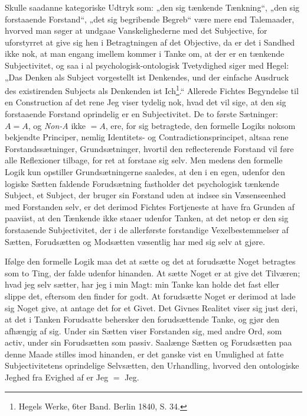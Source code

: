 \documentclass[11pt]{book}
\newcommand{\opage}[1]{\marginnote{\footnotesize\textit{[#1]}}}
\begin{document}
Skulle saadanne kategoriske Udtryk som: „den sig tænkende Tænkning“, „den
sig forstaaende Forstand“, „det sig begribende Begreb“ være mere end
Talemaader, hvorved man søger at undgaae Vanskelighederne med det
Subjective, for uforstyrret at give sig hen i Betragtningen af det
Objective, da er det i Sandhed ikke nok, at man engang imellem kommer i
Tanke om, at der er en tænkende Subjectivitet, og
\opage{64} \setcounter{footnote}{0}%
saa i al psychologisk-ontologisk Tvetydighed siger med Hegel: „Das Denken
als Subject vorgestellt ist Denkendes, und der einfache Ausdruck des
existirenden Subjects als Denkenden ist Ich\footnote{Hegels Werke, 6ter
Band. Berlin 1840, S. 34.}.“ Allerede Fichtes Begyndelse til en
Construction af det rene Jeg viser tydelig nok, hvad det vil sige, at den
sig forstaaende Forstand oprindelig er en Subjectivitet. De to første
Sætninger: $A = A$, og \textit{Non-A} ikke $= A$, ere, for sig betragtede,
den formelle Logiks noksom bekjendte Principer, nemlig Identitets- og
Contradictionsprincipet, altsaa rene Forstandssætninger, Grundsætninger,
hvortil den reflecterende Forstand vil føre alle Reflexioner tilbage, for
ret at forstaae sig selv. Men medens den formelle Logik kun opstiller
Grundsætningerne saaledes, at den i en egen, udenfor den logiske Sætten
faldende Forudsætning fastholder det psychologisk tænkende Subject, et
Subject, der bruger sin Forstand uden at indsee sin Væsenseenhed med
Forstanden selv, er det derimod Fichtes Fortjeneste at have fra Grunden af
paaviist, at den Tænkende ikke staaer udenfor Tanken, at det netop er den
sig forstaaende Subjectivitet, der i de allerførste forstandige
Vexelbestemmelser af Sætten, Forudsætten og Modsætten væsentlig har med sig
selv at gjøre.

Ifølge den formelle Logik maa det at sætte og det at forudsætte Noget
betragtes som to Ting, der falde udenfor hinanden. At sætte Noget er at
give det Tilværen; hvad jeg selv sætter, har jeg i min Magt: min Tanke kan
holde det fast eller slippe det, eftersom den finder for godt. At
forudsætte Noget er derimod at lade sig Noget give, at antage det for et
Givet. Det Givnes Realitet viser sig just deri, at det i Tanken Forudsatte
behersker den forudsættende Tanke, og gjør den afhængig af sig. Under sin
Sætten viser Forstanden sig, med andre Ord, som activ, under sin
Forudsætten som passiv. Saalænge Sætten og Forudsætten paa denne
\opage{65} \setcounter{footnote}{0}%
Maade stilles imod hinanden, er det ganske vist en Umulighed at fatte
Subjectivitetens oprindelige Selvsætten, den Urhandling, hvorved den
ontologiske Jeghed fra Evighed af er Jeg $=$ Jeg.
\end{document}
